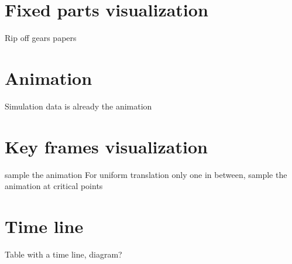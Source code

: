 \section{Fixed parts visualization}

Rip off gears papers

\section{Animation}

Simulation data is already the animation

\section{Key frames visualization}

sample the animation
For uniform translation only one in between, sample the animation at critical points

\section{Time line}

Table with a time line, diagram?